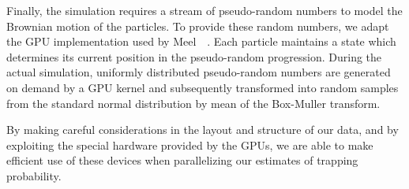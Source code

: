 Finally, the simulation requires a stream of pseudo-random numbers to
model the Brownian motion of the particles.  To provide these random
numbers, we adapt the GPU implementation used by
Meel~\etal~\cite{Meel:2008:MDGPU}.  Each particle maintains a state
which determines its current position in the pseudo-random
progression.  During the actual simulation, uniformly distributed
pseudo-random numbers are generated on demand by a GPU kernel and
subsequently transformed into random samples from the standard normal
distribution by mean of the Box-Muller transform.


By making careful considerations in the layout and structure of our
data, and by exploiting the special hardware provided by the GPUs, we
are able to make efficient use of these devices when parallelizing our
estimates of trapping probability.

